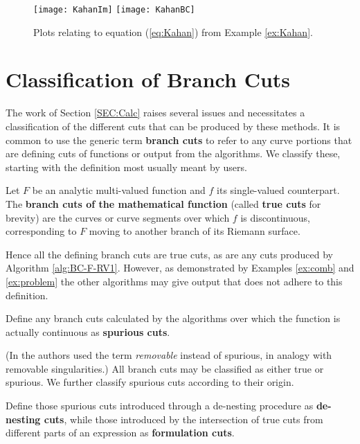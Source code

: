 \documentclass{llncs}
\begin{document}
\begin{figure}[ht] 
\begin{center}
\texttt{[image: KahanIm]}
\hspace*{0.3cm}
\texttt{[image: KahanBC]}
\end{center}
\caption{Plots relating to equation (\ref{eq:Kahan}) from Example \ref{ex:Kahan}.} 
\label{fig:Kahan}
\end{figure}


\section{Classification of Branch Cuts} 
\label{SEC:Types}

The work of Section \ref{SEC:Calc} raises several issues and necessitates a classification of the different cuts that can be produced by these methods.  It is common to use the generic term \textbf{branch cuts} to refer to any curve portions that are defining cuts of functions or output from the algorithms.  We classify these, starting with the definition most usually meant by users.

\begin{definition}
Let $F$ be an analytic multi-valued function and $f$ its single-valued counterpart.  The \textbf{branch cuts of the mathematical function} (called \textbf{true cuts} for brevity) are the curves or curve segments over which $f$ is discontinuous, corresponding to $F$ moving to another branch of its Riemann surface.  
\end{definition}

Hence all the defining branch cuts are true cuts, as are any cuts produced by Algorithm \ref{alg:BC-F-RV1}.  However, as demonstrated by Examples \ref{ex:comb} and \ref{ex:problem} the other algorithms may give output that does not adhere to this definition.

\begin{definition}
Define any branch cuts calculated by the algorithms over which the function is actually continuous as \textbf{spurious cuts}.
\end{definition}

(In \cite{DF94} the authors used the term {\em removable} instead of spurious, in analogy with removable singularities.)  All branch cuts may be classified as either true or spurious.  We further classify spurious cuts according to their origin.

\begin{definition}
\label{def:spurioustypes}
Define those spurious cuts introduced through a de-nesting procedure as \textbf{de-nesting cuts}, while those introduced by the intersection of true cuts from different parts of an expression as \textbf{formulation cuts}.
\end{definition}
\end{document}
